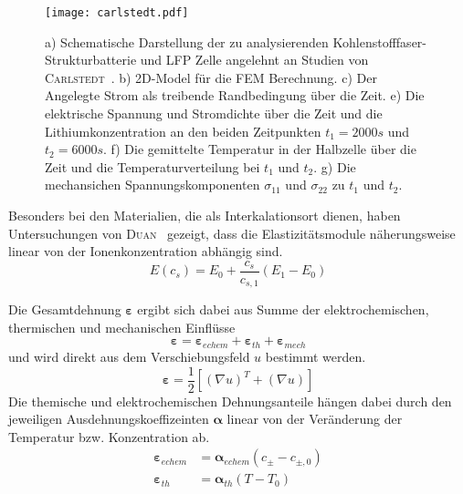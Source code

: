 \begin{figure}[!ht]
        \center
		\texttt{[image: carlstedt.pdf]}
		\caption{\label{fig:carlstedt}a) Schematische Darstellung der zu analysierenden Kohlenstofffaser-Strukturbatterie und LFP Zelle angelehnt an Studien von \textsc{Carlstedt}~\cite{Carlstedt2022b}. b) 2D-Model für die FEM Berechnung. c) Der Angelegte Strom als treibende Randbedingung über die Zeit. e) Die elektrische Spannung und Stromdichte über die Zeit und die Lithiumkonzentration an den beiden Zeitpunkten $t_1= 2000s$ und $t_2= 6000s$. f) Die gemittelte Temperatur in der Halbzelle über die Zeit und die Temperaturverteilung bei $t_1$ und $t_2$. g) Die mechansichen Spannungskomponenten $\sigma_{11}$ und $\sigma_{22}$ zu $t_1$ und $t_2$.}
\end{figure}

Besonders bei den Materialien, die als Interkalationsort dienen, haben Untersuchungen von \textsc{Duan}~\cite{Duan2021} gezeigt, dass die Elastizitätsmodule näherungsweise linear von der Ionenkonzentration abhängig sind.
\begin{equation}
    E(c_{s}) = E_0 + \frac{c_{s}}{c_{s,1}} (E_1 - E_0)
\end{equation}

Die Gesamtdehnung $\boldsymbol{\varepsilon}$ ergibt sich dabei aus Summe der elektrochemischen, thermischen und mechanischen Einflüsse
\begin{equation}
    \boldsymbol{\varepsilon} = \boldsymbol{\varepsilon}_{echem} +\boldsymbol{\varepsilon}_{th} + \boldsymbol{\varepsilon}_{mech}
\end{equation}
und wird direkt aus dem Verschiebungsfeld $u$ bestimmt werden.
\begin{equation}
    \boldsymbol{\varepsilon} = \frac{1}{2}\left[\left(\nabla u\right)^T + \left(\nabla u\right)\right]
\end{equation}
Die themische und elektrochemischen Dehnungsanteile hängen dabei durch den jeweiligen Ausdehnungskoeffizeinten $\boldsymbol{\alpha}$ linear von der Veränderung der Temperatur bzw. Konzentration ab.
\begin{align}
    \boldsymbol{\varepsilon}_{echem} &= \boldsymbol{\alpha}_{echem} \left(c_{\pm}-c_{\pm,0}\right)\\
    \boldsymbol{\varepsilon}_{th}  &= \boldsymbol{\alpha}_{th}\left( T - T_0\right)
\end{align}

